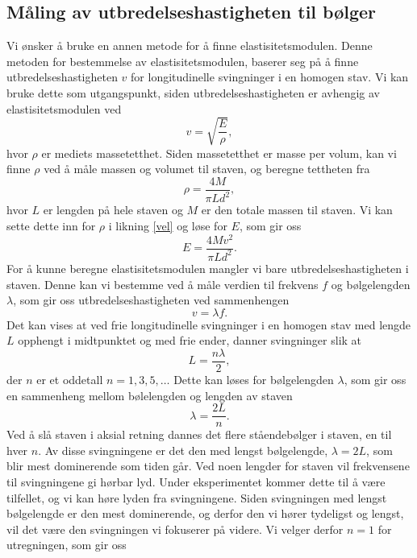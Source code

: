 \documentclass[%
 reprint,
 amsmath,amssymb,
 aps,
 norsk,
 booktabs
]{revtex4-1}
\begin{document}
\subsection{Måling av utbredelseshastigheten til bølger}\label{teori-b}
Vi ønsker å bruke en annen metode for å finne elastisitetsmodulen. Denne metoden for bestemmelse av elastisitetsmodulen, baserer seg på å finne utbredelseshastigheten $v$ for longitudinelle svingninger i en homogen stav. Vi kan bruke dette som utgangspunkt, siden utbredelseshastigheten er avhengig av elastisitetsmodulen ved
\begin{equation}
  v = \sqrt{\frac{E}{\rho}},\label{vel}
\end{equation}
hvor $\rho$ er mediets massetetthet. Siden massetetthet er masse per volum, kan vi finne $\rho$ ved å måle massen og volumet til staven, og beregne tettheten fra
\begin{equation*}
  \rho = \frac{4M}{\pi L d^2},
\end{equation*}
hvor $L$ er lengden på hele staven og $M$ er den totale massen til staven. Vi kan sette dette inn for $\rho$ i likning \eqref{vel} og løse for $E$, som gir oss
\begin{equation}
  E = \frac{4Mv^2}{\pi L d^2}.\label{elast}
\end{equation}
For å kunne beregne elastisitetsmodulen mangler vi bare utbredelseshastigheten i staven. Denne kan vi bestemme ved å måle verdien til frekvens $f$ og bølgelengden $\lambda$, som gir oss utbredelseshastigheten ved sammenhengen
\begin{equation}
  v = \lambda f.\label{vlf}
\end{equation}
Det kan vises \cite{oppgave} at ved frie longitudinelle svingninger i en homogen stav med lengde $L$ opphengt i midtpunktet og med frie ender, danner svingninger slik at
\begin{equation*}
  L = \frac{n\lambda}{2},
\end{equation*}
der $n$ er et oddetall $n = 1, 3, 5, \ldots$ Dette kan løses for bølgelengden $\lambda$, som gir oss en sammenheng mellom bølelengden og lengden av staven
\begin{equation*}
  \lambda = \frac{2L}{n}.
\end{equation*}
Ved å slå staven i aksial retning dannes det flere ståendebølger i staven, en til hver $n$. Av disse svingningene er det den med lengst bølgelengde, $\lambda = 2L$, som blir mest dominerende som tiden går. Ved noen lengder for staven vil frekvensene til svingningene gi hørbar lyd. Under eksperimentet kommer dette til å være tilfellet, og vi kan høre lyden fra svingningene. Siden svingningen med lengst bølgelengde er den mest dominerende, og derfor den vi hører tydeligst og lengst, vil det være den svingningen vi fokuserer på videre. Vi velger derfor $n=1$ for utregningen, som gir oss
\end{document}
